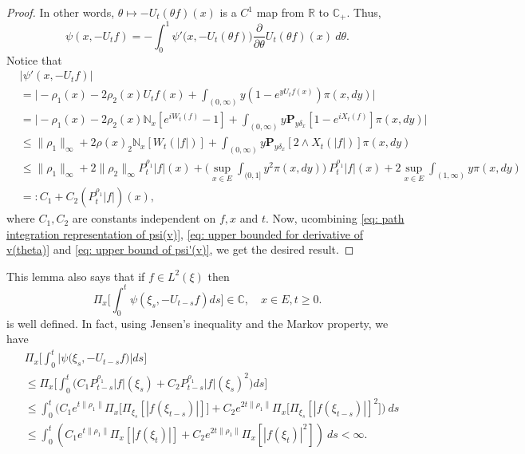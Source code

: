 \documentclass[12pt,a4paper]{amsart}
\theoremstyle{plain}
\theoremstyle{definition}
\numberwithin{equation}{section}
\begin{document}
\begin{proof}
    In other words, $\theta \mapsto -U_t(\theta f)(x)$ is a $C^1$ map from $\mathbb R$ to $\mathbb C_+$.
    Thus,
\begin{equation}
\label{eq: path integration representation of psi(v)}
    \psi(x,-U_tf) 
    = -\int_0^1 \psi'\big(x,-U_t(\theta f)\big) \frac{\partial}{\partial \theta} U_t(\theta f)(x)~d\theta.
\end{equation}
    Notice that
\begin{equation}
\label{eq: upper bound of psi'(v)}
\begin{split}
    &|\psi'(x, -U_tf)|
    \\&= \Big| -\rho_1(x)- 2\rho_2(x) U_tf(x)+ \int_{(0,\infty)} y (1- e^{y U_tf(x)} ) \pi(x,dy)\Big|
    \\&= \Big| - \rho_1(x)- 2\rho_2(x)\mathbb N_x[e^{i W_{t}(f)} - 1]  + \int_{(0,\infty)} y \mathbf P_{y \delta_x}[1-e^{i X_{t}(f)}] \pi(x,dy) \Big|
    \\ &\leq \|\rho_1\|_\infty + 2\rho(x)_2\mathbb N_x[W_t(|f|)]+ \int_{(0,\infty)} y\mathbf P_{y\delta_x}[2\wedge X_t(|f|)] \pi(x,dy)
    \\ &\leq \|\rho_1\|_\infty + 2\|\rho_2\|_\infty
    P^{\rho_1}_t |f|(x) + \Big(\sup_{x\in E}\int_{(0,1]}y^2 \pi(x,dy)\Big)~P^{\rho_1}_t |f|(x) + 2\sup_{x\in E}\int_{(1,\infty)} y \pi(x,dy)
    \\ &=: C_1 + C_2(P^{\rho_1}_t |f|)(x),
\end{split}
\end{equation}
    where $C_1, C_2$ are constants independent on $f,x$ and $t$.
    Now, ucombining \eqref{eq: path integration representation of psi(v)}, \eqref{eq: upper bounded for derivative of v(theta)} and \eqref{eq: upper bound of psi'(v)}, we get the desired result.
\end{proof}

    This lemma also says that if $f\in L^2(\xi)$ then 
\[
    \Pi_x\Big[\int_0^t \psi(\xi_s,- U_{t-s}f)ds\Big]
    \in \mathbb C,
    \quad x\in E, t\geq 0.
\]
    is well defined.
    In fact, using Jensen's inequality and the Markov property, we have
\begin{equation}\begin{split}
\label{eq: domination of psi(v)}
    &\Pi_x\Big[\int_0^t \big|\psi \big(\xi_s,-U_{t-s}f\big)\big|ds\Big]
    \\&\leq \Pi_x\Big[\int_0^t \big(C_1 P_{t-s}^{\rho_1}|f|(\xi_s)+C_2 P_{t-s}^{\rho_1}|f|(\xi_s)^2\big)ds\Big]
    \\ &\leq \int_0^t \big(C_1 e^{t\|\rho_1\|}\Pi_x \big[ \Pi_{\xi_s}[|f(\xi_{t-s})|] \big]+C_2 e^{2t\|\rho_1\|}\Pi_x \big[ \Pi_{\xi_s}[|f (\xi_{t-s})|]^2 \big]\big)~ds
    \\ &\leq \int_0^t (C_1 e^{t\|\rho_1\|}\Pi_x [ |f(\xi_{t})|]+C_2e^{2t\|\rho_1\|}\Pi_x [ |f (\xi_{t})|^2 ])~ds < \infty.
\end{split}\end{equation}
\end{document}
